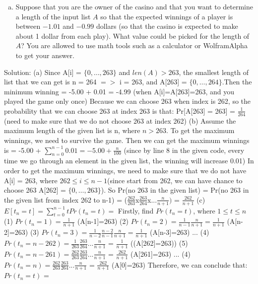 \documentclass{assignment-263}
\begin{document}
\begin{enumerate}
\begin{enumerate}[(a)]
			\item Suppose that you are the owner of the casino and that you want to
				determine a length of the input list $A$ so that the
				expected winnings of a player is between $-1.01$ and $-0.99$
				dollars (so that the casino is expected to make about 1
				dollar from each play). What value could be picked for the
				length of $A$? You are allowed to use math tools such as a
				calculator or WolframAlpha to get your answer.
		\end{enumerate}
Solution:\vskip5pt
(a) Since A[i] = $\{0,\ldots, 263\}$ and $len(A) > 263$, the smallest length of list that we can get is n = 264 $=>$ i = 263, and A[263] = $\{0,\ldots, 264\}$.Then the minimum winning =  -5.00 + 0.01 = -4.99 (when A[i]=A[263]=263, and you played the game only once)\vskip5pt
Because we can choose 263 when index is 262, so the probability that we can choose 263 at index 263 is that: Pr[A[263] = 263] = $\frac{1}{264}$ (need to make sure that we do not choose 263 at index 262)\vskip5pt  
(b) Assume the maximum length of the given list is n, where $n > 263$. To get the maximum winnings, we need to survive the game. Then we can get the maximum winnings is = -5.00 + $\sum_{n=0}^{n- 1}0.01 = -5.00 + \frac{n}{100}$ (since by line 8 in the given code, every time we go through an element in the given list, the winning will increase 0.01)\vskip5pt 
In order to get the maximum winnings, we need to make sure that we do not have A[i] = 263, where $ 262 \le i \le n-1$(since start from 262, we can have chance to choose 263 A[262] = $\{0,\ldots, 263\}$). So Pr(no 263 in the given list) = Pr(no 263 in the given list from index 262 to n-1) = ($\frac{262}{263}$x$\frac{263}{264}$x...$\frac{n}{n+1})$ = $\frac{262}{n+1}$\vskip5pt
(c) $E[t_{n} = t] = \sum_{t=0}^{n-1}tPr(t_{n}=t) = $\vskip5pt
Firstly, find $Pr(t_{n}=t)$, where $1\le t \le n$\vskip5pt 
(1) $Pr(t_{n} = 1) = \frac{1}{n+1}$  (A[n-1]=263)\vskip5pt
(2) $Pr(t_{n} = 2) = \frac{1}{n-1}\frac{n}{n+1} = \frac{1}{n+1}$    (A[n-2]=263)\vskip5pt
(3) $Pr(t_{n} = 3) =  \frac{1}{n-2}\frac{n-2}{n-1}\frac{n}{n+1} = \frac{1}{n+1}$ (A[n-3]=263)\vskip5pt
...\vskip5pt
(4) $Pr(t_{n} = n - 262) = \frac{1}{263}\frac{263}{264}...\frac{n}{n+1}$ = $\frac{1}{n+1}$ ((A[262]=263)) \vskip5pt
(5) $Pr(t_{n} = n - 261) = \frac{262}{263}\frac{263}{264}...\frac{n}{n+1}$ = $\frac{262}{n+1}$  (A[261]=263)\vskip5pt
...\vskip5pt
(4) $Pr(t_{n} = n) = \frac{262}{263}\frac{263}{264}...\frac{n}{n+1}$  = $\frac{262}{n+1}$  (A[0]=263)\vskip5pt
Therefore, we can conclude that: $Pr(t_{n}=t)$ =\vskip5pt
\begin{equation}

\end{equation}
\end{enumerate}
\end{document}
